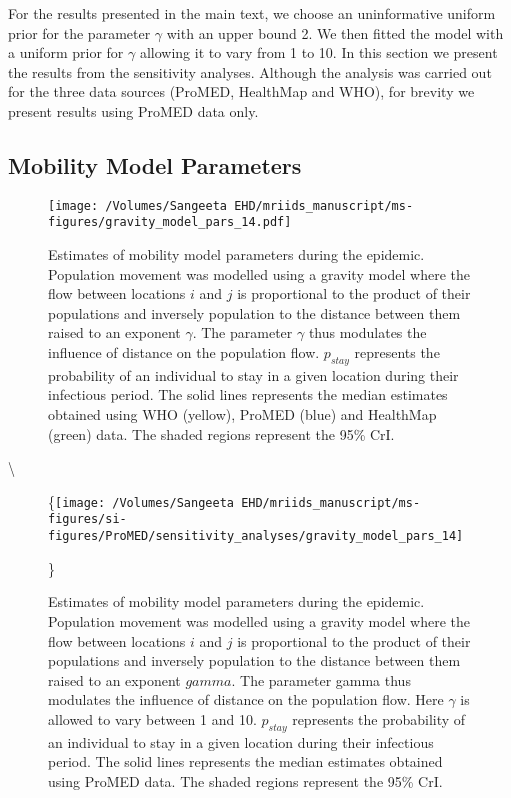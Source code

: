 \documentclass[11pt,]{article}
\begin{document}
For the results presented in the main text, we choose an uninformative
uniform prior for the parameter \(\gamma\) with an upper bound 2. We
then fitted the model with a uniform prior for \(\gamma\) allowing it to
vary from 1 to 10. In this section we present the results from the
sensitivity analyses. Although the analysis was carried out for the
three data sources (ProMED, HealthMap and WHO), for brevity we present
results using ProMED data only.

\hypertarget{mobility-model-parameters}{%
  \subsection{Mobility Model Parameters}\label{mobility-model-parameters}}

\begin{figure}
  \texttt{[image: /Volumes/Sangeeta EHD/mriids\_manuscript/ms-figures/gravity\_model\_pars\_14.pdf]}
  \caption{Estimates of mobility model
    parameters during the epidemic. Population movement was modelled using a
    gravity model where the flow between locations \(i\) and \(j\) is
    proportional to the product of their populations and inversely
    population to the distance between them raised to an exponent
    \(\gamma\). The parameter \(\gamma\) thus modulates the influence of
    distance on the population flow. \(p_{stay}\) represents the probability
    of an individual to stay in a given location during their infectious
    period. The solid lines represents the median estimates obtained using
    WHO (yellow), ProMED (blue) and HealthMap (green) data. The shaded
    regions represent the 95\% CrI.}
  \label{fig:parsul2}
\end{figure}


\textbackslash \begin{figure}

  \{\centering \texttt{[image: /Volumes/Sangeeta EHD/mriids\_manuscript/ms-figures/si-figures/ProMED/sensitivity\_analyses/gravity\_model\_pars\_14]}

  \}

  \caption{Estimates of mobility model
  parameters during the epidemic. Population movement was modelled using a
  gravity model where the flow between locations \(i\) and \(j\) is
  proportional to the product of their populations and inversely
  population to the distance between them raised to an exponent \(gamma\).
  The parameter gamma thus modulates the influence of distance on the
  population flow. Here \(\gamma\) is allowed to vary between 1 and 10.
  \(p_{stay}\) represents the probability of an individual to stay in a
  given location during their infectious period. The solid lines
  represents the median estimates obtained using ProMED data. The shaded
  regions represent the 95\% CrI.}
\label{fig:SI-33}
\end{figure}
\end{document}
